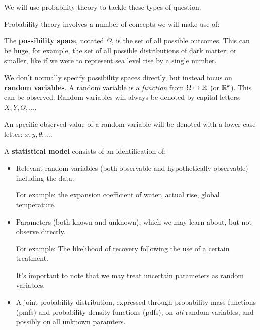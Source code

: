 \documentclass[a4paper]{article}
\begin{document}
            We will use probability theory to tackle these types of question.

            Probability theory involves a number of concepts we will make use
            of:

            \begin{definition}
                The \textbf{possibility space}, notated $\Omega$, is the set of
                all possible outcomes. This can be huge, for example, the set of
                all possible distributions of dark matter; or smaller, like if
                we were to represent sea level rise by a single number.

                We don't normally specify possibility spaces directly, but
                instead focus on \textbf{random variables}. A random variable is
                a \textit{function} from $\Omega \mapsto \mathbb{R}$ (or $\mathbb{R}^k$). This
                can be observed. Random variables will always be denoted by
                capital letters: $X, Y, \Theta, ...$.

                An specific observed value of a random variable will be denoted
                with a lower-case letter: $x, y, \theta, ...$.

                A \textbf{statistical model} consists of an identification of:

                \begin{itemize}
                    \item Relevant random variables (both observable and
                        hypothetically observable) including the data.

                        For example: the expansion coefficient of water, actual
                        rise, global temperature.

                    \item Parameters (both known and unknown), which we may
                        learn about, but not observe directly.

                        For example: The likelihood of recovery following the
                        use of a certain treatment.

                        It's important to note that we may treat uncertain
                        parameters as random variables.

                    \item A joint probability distribution, expressed through
                        probability mass functions (pmfs) and probability
                        density functions (pdfs), on \textit{all} random
                        variables, and possibly on all unknown paramters.
                \end{itemize}
            \end{definition}
\end{document}
